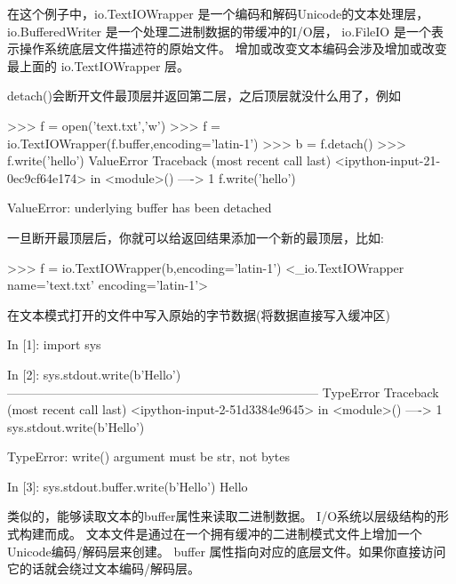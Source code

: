 在这个例子中，io.TextIOWrapper 是一个编码和解码Unicode的文本处理层， io.BufferedWriter 是一个处理二进制数据的带缓冲的I/O层， io.FileIO 是一个表示操作系统底层文件描述符的原始文件。 增加或改变文本编码会涉及增加或改变最上面的 io.TextIOWrapper 层。\par
detach()会断开文件最顶层并返回第二层，之后顶层就没什么用了，例如
\begin{python}
>>> f = open('text.txt','w')
>>> f = io.TextIOWrapper(f.buffer,encoding='latin-1')
>>> b = f.detach()
>>> f.write('hello')
ValueError                                Traceback (most recent call last)
<ipython-input-21-0ec9cf64e174> in <module>()
----> 1 f.write('hello')

ValueError: underlying buffer has been detached
\end{python}
一旦断开最顶层后，你就可以给返回结果添加一个新的最顶层，比如:
\begin{python}
>>> f = io.TextIOWrapper(b,encoding='latin-1')
<_io.TextIOWrapper name='text.txt' encoding='latin-1'>
\end{python}
在文本模式打开的文件中写入原始的字节数据(将数据直接写入缓冲区)
\begin{python}
In [1]: import sys

In [2]: sys.stdout.write(b'Hello\n')
---------------------------------------------------------------------------
TypeError                                 Traceback (most recent call last)
<ipython-input-2-51d3384e9645> in <module>()
----> 1 sys.stdout.write(b'Hello\n')

TypeError: write() argument must be str, not bytes

In [3]: sys.stdout.buffer.write(b'Hello\n')
Hello

\end{python}
类似的，能够读取文本的buffer属性来读取二进制数据。
I/O系统以层级结构的形式构建而成。 文本文件是通过在一个拥有缓冲的二进制模式文件上增加一个Unicode编码/解码层来创建。 buffer 属性指向对应的底层文件。如果你直接访问它的话就会绕过文本编码/解码层。

